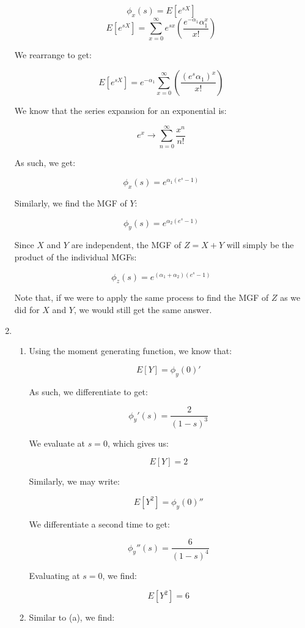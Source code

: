\begin{enumerate}
    $$\phi_x(s)=E[e^{sX}]$$
    $$E[e^{sX}]=\sum_{x=0}^{\infty}e^{sx}\left( \frac{e^{-\alpha_1}\alpha_1^x}{x!} \right)$$

    We rearrange to get:

    $$E[e^{sX}]=e^{-\alpha_1}\sum_{x=0}^{\infty}\left( \frac{(e^{s}\alpha_1)^x}{x!} \right)$$

    We know that the series expansion for an exponential is:

    $$e^x\to\sum_{n=0}^{\infty} \frac{x^n}{n!}$$

    As such, we get:

    $$\boxed{\phi_x(s)=e^{\alpha_1(e^s-1)}}$$

    Similarly, we find the MGF of $Y$:

    $$\boxed{\phi_y(s)=e^{\alpha_2(e^s-1)}}$$

    Since $X$ and $Y$ are independent, the MGF of $Z=X+Y$ will simply be the product of the individual MGFs:

    $$\boxed{\phi_z(s)=e^{(\alpha_1+\alpha_2)(e^{s}-1)}}$$

    Note that, if we were to apply the same process to find the MGF of $Z$ as we did for $X$ and $Y$, we would still get the same answer.

    \setcounter{enumi}{6}

  \item

    \begin{enumerate}

      \item Using the moment generating function, we know that:

        $$E[Y]=\phi_y(0)'$$

        As such, we differentiate to get:

        $$\phi_y'(s)=\frac{2}{(1-s)^3}$$

        We evaluate at $s=0$, which gives us:

        $$\boxed{E[Y]=2}$$

        Similarly, we may write:

        $$E[Y^2]=\phi_y(0)''$$

        We differentiate a second time to get:

        $$\phi_y''(s)=\frac{6}{(1-s)^4}$$

        Evaluating at $s=0$, we find:

        $$\boxed{E[Y^2]=6}$$

      \item Similar to (a), we find:


\end{enumerate}
\end{enumerate}

